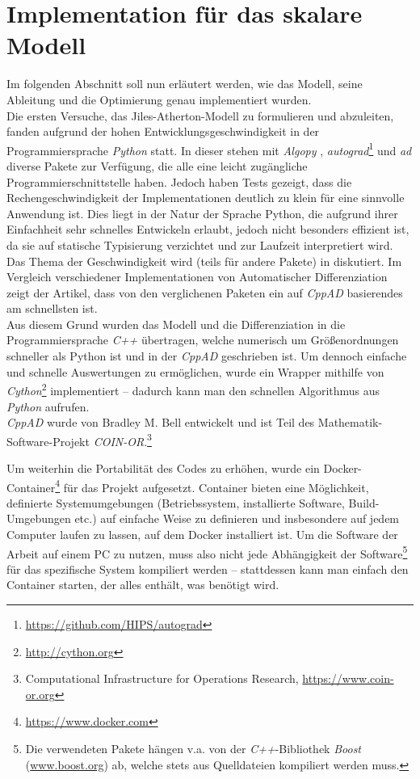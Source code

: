 \documentclass{scrartcl}
\begin{document}
\section{Implementation für das skalare Modell}
Im folgenden Abschnitt soll nun erläutert werden, wie das Modell, seine Ableitung und die Optimierung genau implementiert wurden.\\
Die ersten Versuche, das Jiles-Atherton-Modell zu formulieren und abzuleiten, fanden aufgrund der hohen Entwicklungsgeschwindigkeit in der Programmiersprache \emph{Python} statt. In dieser stehen mit \emph{Algopy} \cite{Algopy}, \emph{autograd}\footnote{\url{https://github.com/HIPS/autograd}} und \emph{ad} \cite{ad} diverse Pakete zur Verfügung, die alle eine leicht zugängliche Programmierschnittstelle haben. Jedoch haben Tests gezeigt, dass die Rechengeschwindigkeit der Implementationen deutlich zu klein für eine sinnvolle Anwendung ist. Dies liegt in der Natur der Sprache Python, die aufgrund ihrer Einfachheit sehr schnelles Entwickeln erlaubt, jedoch nicht besonders effizient ist, da sie auf statische Typisierung verzichtet und zur Laufzeit interpretiert wird.\\
Das Thema der Geschwindigkeit wird (teils für andere Pakete) in \cite{speed} diskutiert. Im Vergleich verschiedener Implementationen von Automatischer Differenziation zeigt der Artikel, dass von den verglichenen Paketen ein auf \emph{CppAD} \cite{CppAD2012} basierendes am schnellsten ist.\\
Aus diesem Grund wurden das Modell und die Differenziation in die Programmiersprache \emph{C++} übertragen, welche numerisch um Größenordnungen schneller als Python ist und in der \emph{CppAD} geschrieben ist. Um dennoch einfache und schnelle Auswertungen zu ermöglichen, wurde ein Wrapper mithilfe von \emph{Cython}\footnote{\url{http://cython.org}} implementiert -- dadurch kann man den schnellen Algorithmus aus \emph{Python} aufrufen.\\
\emph{CppAD} wurde von Bradley M. Bell entwickelt und ist Teil des Mathematik-Software-Projekt \emph{COIN-OR}.\footnote{Computational Infrastructure for Operations Research, \url{https://www.coin-or.org}}\par
Um weiterhin die Portabilität des Codes zu erhöhen, wurde ein Docker-Container\footnote{\url{https://www.docker.com}} für das Projekt aufgesetzt. Container bieten eine Möglichkeit, definierte Systemumgebungen (Betriebssystem, installierte Software, Build-Umgebungen etc.) auf einfache Weise zu definieren und insbesondere auf jedem Computer laufen zu lassen, auf dem Docker installiert ist. Um die Software der Arbeit auf einem PC zu nutzen, muss also nicht jede Abhängigkeit der Software\footnote{Die verwendeten Pakete hängen v.a. von der \emph{C++}-Bibliothek \emph{Boost} (\url{www.boost.org}) ab, welche stets aus Quelldateien kompiliert werden muss.} für das spezifische System kompiliert werden -- stattdessen kann man einfach den Container starten, der alles enthält, was benötigt wird.\\
\end{document}
